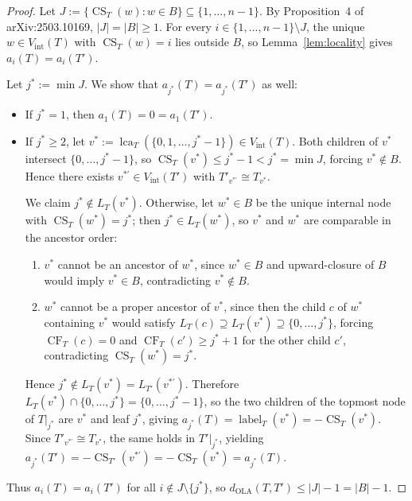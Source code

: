 \documentclass[11pt]{article}
\theoremstyle{definition}
\theoremstyle{remark}
\DeclareMathOperator{\lca}{lca}
\DeclareMathOperator{\CF}{CF}
\DeclareMathOperator{\CS}{CS}
\DeclareMathOperator{\labelop}{label}
\begin{document}
\begin{proof}
Let $J := \{\CS_T(w) : w \in B\} \subseteq \{1, \dots, n-1\}$. By Proposition~4 of arXiv:2503.10169, $|J| = |B| \ge 1$. For every $i \in \{1, \dots, n-1\} \setminus J$, the unique $w \in V_{\mathrm{int}}(T)$ with $\CS_T(w) = i$ lies outside $B$, so Lemma~\ref{lem:locality} gives $a_i(T) = a_i(T')$.

Let $j^* := \min J$. We show that $a_{j^*}(T) = a_{j^*}(T')$ as well:
\begin{itemize}[leftmargin=2em,itemsep=3pt]
  \item If $j^* = 1$, then $a_1(T) = 0 = a_1(T')$.
  \item If $j^* \ge 2$, let $v^* := \lca_T(\{0, 1, \dots, j^* - 1\}) \in V_{\mathrm{int}}(T)$. Both children of $v^*$ intersect $\{0, \dots, j^* - 1\}$, so $\CS_T(v^*) \le j^* - 1 < j^* = \min J$, forcing $v^* \notin B$. Hence there exists $v^{*\prime} \in V_{\mathrm{int}}(T')$ with $T'_{v^{*\prime}} \cong T_{v^*}$.

  We claim $j^* \notin L_T(v^*)$. Otherwise, let $w^* \in B$ be the unique internal node with $\CS_T(w^*) = j^*$; then $j^* \in L_T(w^*)$, so $v^*$ and $w^*$ are comparable in the ancestor order:
  \begin{enumerate}[label=\textup{(\roman*)},leftmargin=2em,itemsep=2pt]
    \item $v^*$ cannot be an ancestor of $w^*$, since $w^* \in B$ and upward-closure of $B$ would imply $v^* \in B$, contradicting $v^* \notin B$.
    \item $w^*$ cannot be a proper ancestor of $v^*$, since then the child $c$ of $w^*$ containing $v^*$ would satisfy $L_T(c) \supseteq L_T(v^*) \supseteq \{0, \dots, j^*\}$, forcing $\CF_T(c) = 0$ and $\CF_T(c') \ge j^* + 1$ for the other child $c'$, contradicting $\CS_T(w^*) = j^*$.
  \end{enumerate}
  Hence $j^* \notin L_T(v^*) = L_{T'}(v^{*\prime})$. Therefore $L_T(v^*) \cap \{0, \dots, j^*\} = \{0, \dots, j^* - 1\}$, so the two children of the topmost node of $T|_{j^*}$ are $v^*$ and leaf $j^*$, giving $a_{j^*}(T) = \labelop_T(v^*) = -\CS_T(v^*)$. Since $T'_{v^{*\prime}} \cong T_{v^*}$, the same holds in $T'|_{j^*}$, yielding $a_{j^*}(T') = -\CS_{T'}(v^{*\prime}) = -\CS_T(v^*) = a_{j^*}(T)$.
\end{itemize}
Thus $a_i(T) = a_i(T')$ for all $i \notin J \setminus \{j^*\}$, so $d_{\mathrm{OLA}}(T, T') \le |J| - 1 = |B| - 1$.
\end{proof}
\end{document}
